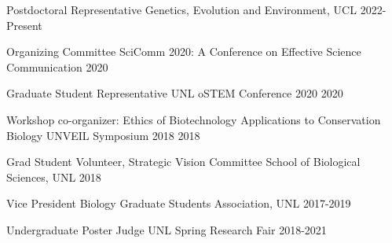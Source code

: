 \begin{cvservices}
\cvservice
    {Postdoctoral Representative}
    {Genetics, Evolution and Environment, UCL}
    {2022-Present}

\cvservice
    {Organizing Committee}
    {SciComm 2020: A Conference on Effective Science Communication}
    {2020}

 \cvservice
    {Graduate Student Representative}
    {UNL oSTEM Conference 2020}
    {2020}
    
  \cvservice
    {Workshop co-organizer: Ethics of Biotechnology Applications to Conservation Biology}
    {UNVEIL Symposium 2018}
    {2018}

  \cvservice
    {Grad Student Volunteer, Strategic Vision Committee}
    {School of Biological Sciences, UNL}
    {2018}
    
  \cvservice
    {Vice President}
    {Biology Graduate Students Association, UNL}
    {2017-2019}
    
  \cvservice
    {Undergraduate Poster Judge}
    {UNL Spring Research Fair}
    {2018-2021}
\end{cvservices}

